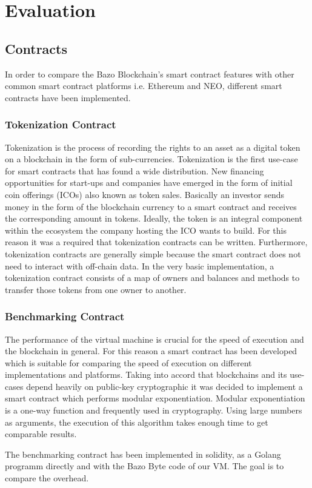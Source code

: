 \chapter{Evaluation}

\section{Contracts}
In order to compare the Bazo Blockchain's smart contract features with other common smart contract platforms i.e. Ethereum and NEO, different smart contracts have been implemented.

\subsection{Tokenization Contract}
Tokenization is the process of recording the rights to an asset as a digital token on a blockchain in the form of sub-currencies. \cite{eth_whitepaper} Tokenization is the first use-case for smart contracts that has found a wide distribution. New financing opportunities for start-ups and companies have emerged in the form of initial coin offerings (ICOs) also known as token sales. Basically an investor sends money in the form of the blockchain currency to a smart contract and receives the corresponding amount in tokens. Ideally, the token is an integral component within the ecosystem the company hosting the ICO wants to build. For this reason it was a required that tokenization contracts can be written. Furthermore, tokenization contracts are generally simple because the smart contract does not need to interact with off-chain data. In the very basic implementation, a tokenization contract consists of a map of owners and balances and methods to transfer those tokens from one owner to another.

\subsection{Benchmarking Contract}
The performance of the virtual machine is crucial for the speed of execution and the blockchain in general. For this reason a smart contract has been developed which is suitable for comparing the speed of execution on different implementations and platforms. Taking into accord that blockchains and its use-cases depend heavily on public-key cryptographic it was decided to implement a smart contract which performs modular exponentiation. Modular exponentiation is a one-way function and frequently used in cryptography. Using large numbers as arguments, the execution of this algorithm takes enough time to get comparable results. 

The benchmarking contract has been implemented in solidity, as a Golang programm directly and with the Bazo Byte code of our VM. The goal is to compare the overhead.
